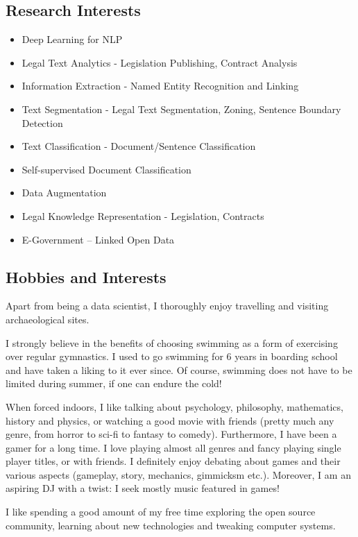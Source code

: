 \documentclass[a4paper,oneside,11pt]{article}
\begin{document}
\subsection*{Research Interests}

\begin{itemize}

\item Deep Learning for NLP
\item Legal Text Analytics - Legislation Publishing, Contract Analysis
\item Information Extraction - Named Entity Recognition and Linking
\item Text Segmentation - Legal Text Segmentation, Zoning, Sentence Boundary Detection
\item Text Classification - Document/Sentence Classification
\item Self-supervised Document Classification
\item Data Augmentation
\item Legal Knowledge Representation - Legislation, Contracts
\item E-Government – Linked Open Data

\end{itemize}

\subsection*{Hobbies and Interests}

Apart from being a data scientist, I thoroughly enjoy travelling and visiting archaeological sites.

I strongly believe in the benefits of choosing swimming as a form of exercising over regular gymnastics. I used to go swimming for 6 years in boarding school and have taken a liking to it ever since. Of course, swimming does not have to be limited during summer, if one can endure the cold!

When forced indoors, I like talking about psychology, philosophy, mathematics, history and physics, or watching a good movie with friends (pretty much any genre, from horror to sci-fi to fantasy to comedy). Furthermore, I have been a gamer for a long time. I love playing almost all genres and fancy playing single player titles, or with friends. I definitely enjoy debating about games and their various aspects (gameplay, story, mechanics, gimmicksm etc.). Moreover, I am an aspiring DJ with a twist: I seek mostly music featured in games!

I like spending a good amount of my free time exploring the open source community, learning about new technologies and tweaking computer systems.
\end{document}
